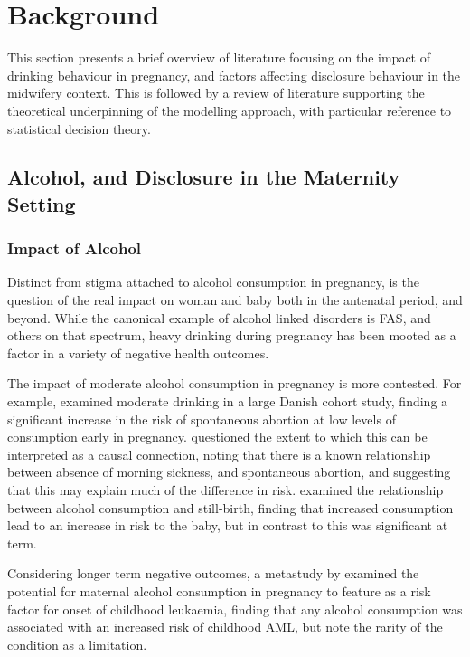 \section{Background}

\label{sec:lit_review}

This section presents a brief overview of literature focusing on the impact
of drinking behaviour in pregnancy, and factors affecting disclosure
behaviour in the midwifery context. This is followed by a review of
literature supporting the theoretical underpinning of the modelling
approach, with particular reference to statistical decision theory.


\subsection{Alcohol, and Disclosure in the Maternity Setting}
\label{sub:alcohol_disclosure}




\subsubsection{Impact of Alcohol\label{sub:Impact-of-Alcohol}}

Distinct from stigma attached to alcohol consumption in pregnancy,
is the question of the real impact on woman and baby both in the \gls{antenatal}
period, and beyond. While the canonical example of alcohol linked
disorders is \ac{FAS}, and others on that spectrum, heavy drinking
during pregnancy has been mooted as a factor in a variety of negative
health outcomes. 

The impact of moderate alcohol consumption in pregnancy is more contested.
For example, \citet{Andersen2012} examined moderate drinking in a
large Danish cohort study, finding a significant increase in the risk
of spontaneous abortion at low levels of consumption early in pregnancy.
\citet{Savitz2012} questioned the extent to which this can be interpreted
as a causal connection, noting that there is a known relationship
between absence of morning sickness, and spontaneous abortion, and
suggesting that this may explain much of the difference in risk. \citet{Kesmodel2002}
examined the relationship between alcohol consumption and still-birth,
finding that increased consumption lead to an increase in risk to
the baby, but in contrast to \citet{Andersen2012} this was significant
at \gls{term}. 

Considering longer term negative outcomes, a metastudy by \citet{Latino-Martel2010}
examined the potential for maternal alcohol consumption in pregnancy
to feature as a risk factor for onset of childhood leukaemia, finding
that any alcohol consumption was associated with an increased risk
of childhood \ac{AML}, but note the rarity of the condition as a
limitation.

